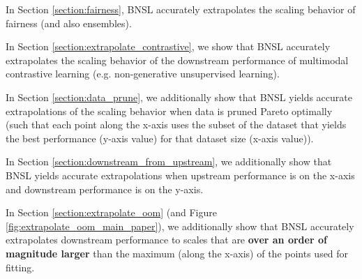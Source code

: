 \documentclass{article} %
\begin{document}
In Section \ref{section:fairness}, BNSL accurately extrapolates the scaling behavior of fairness (and also ensembles).

\vspace{-2.1mm}

In Section \ref{section:extrapolate_contrastive}, we show that BNSL accurately extrapolates the scaling behavior of the downstream performance of multimodal contrastive learning (e.g. non-generative unsupervised learning).

\vspace{-2.1mm}

In Section \ref{section:data_prune}, we additionally show that BNSL yields accurate extrapolations of the scaling behavior when data is pruned Pareto optimally (such that each point along the x-axis uses the subset of the dataset that yields the best performance (y-axis value) for that dataset size (x-axis value)).

\vspace{-2.1mm}

In Section \ref{section:downstream_from_upstream}, we additionally show that BNSL yields accurate extrapolations when upstream performance is on the x-axis and downstream performance is on the y-axis.

\vspace{-2.1mm}

In Section \ref{section:extrapolate_oom} (and Figure \ref{fig:extrapolate_oom_main_paper}), we additionally show that BNSL accurately extrapolates downstream performance to scales that are \textbf{over an order of magnitude larger} than the maximum (along the x-axis) of the points used for fitting.


\iffalse
\end{document}
